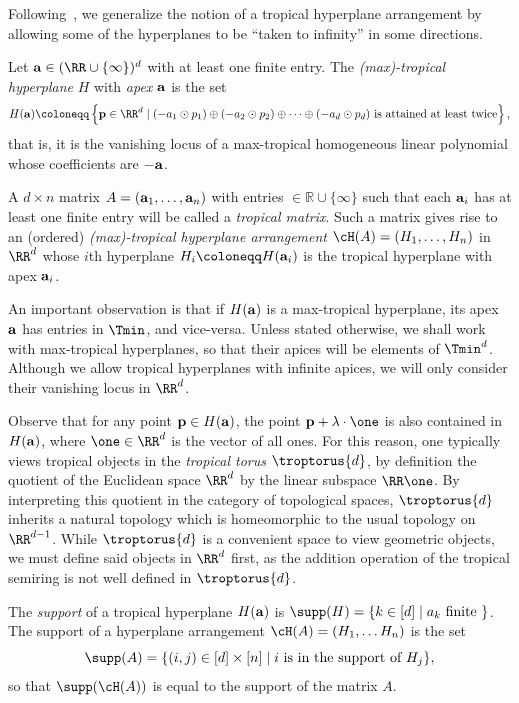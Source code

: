 Following~\cite{fink2015stiefel}, we generalize the notion of a tropical hyperplane arrangement by allowing some of the hyperplanes to be ``taken to infinity'' in some directions. 

\begin{definition}\label{def: tropicalHyperplane}
Let ${\bf a} \in (\RR\cup\{\infty\})^d$ with at least one finite entry.
The \emph{(max)-tropical hyperplane} $H$ with \emph{apex} ${\bf a}$ is the set
{\small \[ H({\bf a}) \coloneqq \left\{{\bf p}\in\RR^d\mid (-a_1\odot p_1)\oplus (-a_2\odot p_2)\oplus \dots \oplus (-a_d\odot p_d) \text{ is attained at least twice} \right\}, \]}that is, it is the vanishing locus of a max-tropical homogeneous linear polynomial whose coefficients are $-{\bf a}$.


A $d \times n$ matrix $A = ({\bf a}_1,\dots, {\bf a}_n)$ with entries $ \in {\mathbb R} \cup \{\infty\}$ such that each ${\bf a}_i$ has at least one finite entry will be called a \emph{tropical matrix}.  Such a matrix gives rise to an (ordered) \textit{(max)-tropical hyperplane arrangement} $\cH(A) = (H_1,\dots, H_n)$ in $\RR^d$ whose $i$th hyperplane $H_i \coloneqq  H({\bf a}_i)$ is the tropical hyperplane with apex ${\bf a}_i$.
\end{definition}

An important observation is that if $H({\bf a})$ is a max-tropical hyperplane, its apex ${\bf a}$ has entries in $\Tmin$, and vice-versa.
Unless stated otherwise, we shall work with max-tropical hyperplanes, so that their apices will be elements of $\Tmin^d$.
Although we allow tropical hyperplanes with infinite apices, we will only consider their vanishing locus in $\RR^d$.

Observe that for any point ${\bf p} \in H({\bf a})$, the point ${\bf p} + \lambda\cdot\one$ is also contained in $H({\bf a})$, where $\one\in\RR^d$ is the vector of all ones.
For this reason, one typically views tropical objects in the \emph{tropical torus} $\troptorus{d}$, by definition the quotient of the Euclidean space $\RR^d$ by the linear subspace $\RR\one$.
By interpreting this quotient in the category of topological spaces, $\troptorus{d}$ inherits a natural topology which is homeomorphic to the usual topology on $\RR^{d-1}$. While $\troptorus{d}$ is a convenient space to view geometric objects, we must define said objects in $\RR^d$ first, as the addition operation of the tropical semiring is not well defined in $\troptorus{d}$.

\begin{definition}\label{def: support}  The \emph{support} of a tropical hyperplane $H({\bf a})$ is $\supp(H) = \{k\in [d] \mid a_k \text{ finite }\}$.
The support of a hyperplane arrangement $\cH(A) = (H_1,\dots H_n)$ is the set
$$
\supp(A) = \{(i,j)\in [d]\times [n]\mid i\text{ is in the support of } H_j\},
$$
so that $\supp(\cH(A))$ is equal to the support of the matrix $A$.
\end{definition}

